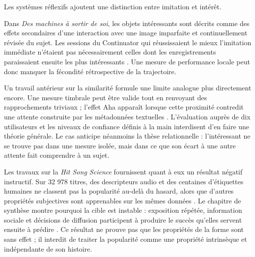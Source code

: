 \documentclass[11pt,a4paper]{article}
\begin{document}
Les systèmes réflexifs ajoutent une distinction entre imitation et intérêt.

Dans \emph{Des machines à sortir de soi}, les objets intéressants sont décrits comme
des effets secondaires d'une interaction avec une image imparfaite et
continuellement révisée du sujet. Les sessions du Continuator qui réussissaient
le mieux l'imitation immédiate n'étaient pas nécessairement celles dont les
enregistrements paraissaient ensuite les plus intéressants
\parencite{pachet2008machines}. Une mesure de performance locale peut donc
manquer la fécondité rétrospective de la trajectoire.

Un travail antérieur sur la similarité formule une limite analogue plus
directement encore. Une mesure timbrale peut être valide tout en renvoyant des
rapprochements triviaux ; l'effet Aha apparaît lorsque cette proximité contredit
une attente construite par les métadonnées textuelles
\parencite{aucouturier2002similarity}. L'évaluation auprès de dix utilisateurs et
les niveaux de confiance définis à la main interdisent d'en faire une théorie
générale. Le cas anticipe néanmoins la thèse relationnelle : l'intéressant ne se
trouve pas dans une mesure isolée, mais dans ce que son écart à une autre attente
fait comprendre à un sujet.

Les travaux sur la \emph{Hit Song Science} fournissent quant à eux un résultat
négatif instructif. Sur 32 978 titres, des descripteurs audio et des centaines
d'étiquettes humaines ne classent pas la popularité au-delà du hasard, alors que
d'autres propriétés subjectives sont apprenables sur les mêmes données
\parencite{pachetroy2008hitsong}. Le chapitre de synthèse montre pourquoi la cible
est instable : exposition répétée, information sociale et décisions de diffusion
participent à produire le succès qu'elles servent ensuite à prédire
\parencite{pachet2011hitsong}. Ce résultat ne prouve pas que les propriétés de la
forme sont sans effet ; il interdit de traiter la popularité comme une propriété
intrinsèque et indépendante de son histoire.
\end{document}
